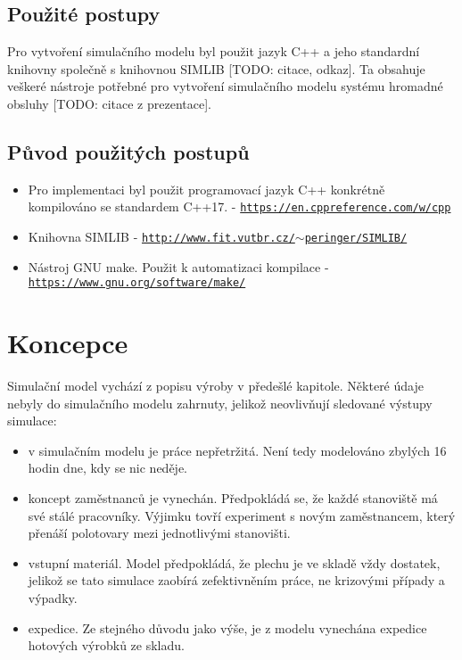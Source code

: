 \documentclass[11pt, a4paper]{article}
\begin{document}
\subsection{Použité postupy}
Pro vytvoření simulačního modelu byl použit jazyk C++ a jeho standardní knihovny společně s knihovnou SIMLIB [TODO: citace, odkaz]. Ta obsahuje veškeré nástroje potřebné pro vytvoření simulačního modelu systému hromadné obsluhy [TODO: citace z prezentace].
\subsection{Původ použitých postupů}
\begin{itemize}
    \item Pro implementaci byl použit programovací jazyk C++ konkrétně kompilováno se standardem C++17. - \href{https://en.cppreference.com/w/cpp}{\texttt{https://en.cppreference.com/w/cpp}}
    \item Knihovna SIMLIB -  \href{http://www.fit.vutbr.cz/~peringer/SIMLIB/}{\texttt{http://www.fit.vutbr.cz/$\sim$peringer/SIMLIB/}}
    \item Nástroj GNU make. Použit k automatizaci kompilace -  \href{https://www.gnu.org/software/make/}{\texttt{https://www.gnu.org/software/make/}}
\end{itemize}

\section{Koncepce}

Simulační model vychází z popisu výroby v předešlé kapitole. Některé údaje nebyly do simulačního modelu zahrnuty, jelikož neovlivňují sledované výstupy simulace:
\begin{itemize}
    \item v simulačním modelu je práce nepřetržitá. Není tedy modelováno zbylých 16 hodin dne, kdy se nic neděje.
    \item koncept zaměstnanců je vynechán. Předpokládá se, že každé stanoviště má své stálé pracovníky. Výjimku tovří experiment s novým zaměstnancem, který přenáší polotovary mezi jednotlivými stanovišti.
    \item vstupní materiál. Model předpokládá, že plechu je ve skladě vždy dostatek, jelikož se tato simulace zaobírá zefektivněním práce, ne krizovými případy a výpadky.
    \item expedice. Ze stejného důvodu jako výše, je z modelu vynechána expedice hotových výrobků ze skladu.
\end{itemize}
\end{document}
